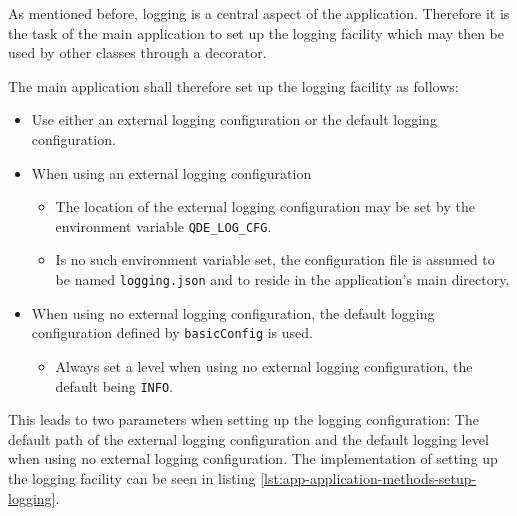 \documentclass[10pt, openright, notitlepage]{scrreprt}
\begin{document}
As mentioned before, logging is a central aspect of the application. Therefore
it is the task of the main application to set up the logging facility which may
then be used by other classes through a decorator.

The main application shall therefore set up the logging facility as follows:

\begin{itemize}
\item Use either an external logging configuration or the default logging configuration.

\item When using an external logging configuration

\begin{itemize}
\item The location of the external logging configuration may be set by the
environment variable \texttt{QDE\_LOG\_CFG}.

\item Is no such environment variable set, the configuration file is assumed to be
named \texttt{logging.json} and to reside in the application's main
directory.
\end{itemize}

\item When using no external logging configuration, the default logging configuration
defined by \texttt{basicConfig} is used.

\begin{itemize}
\item Always set a level when using no external logging configuration, the default
being \texttt{INFO}.
\end{itemize}
\end{itemize}

This leads to two parameters when setting up the logging configuration: The
default path of the external logging configuration and the default logging
level when using no external logging configuration. The implementation of
setting up the logging facility can be seen in listing
\ref{lst:app-application-methods-setup-logging}.
\end{document}
